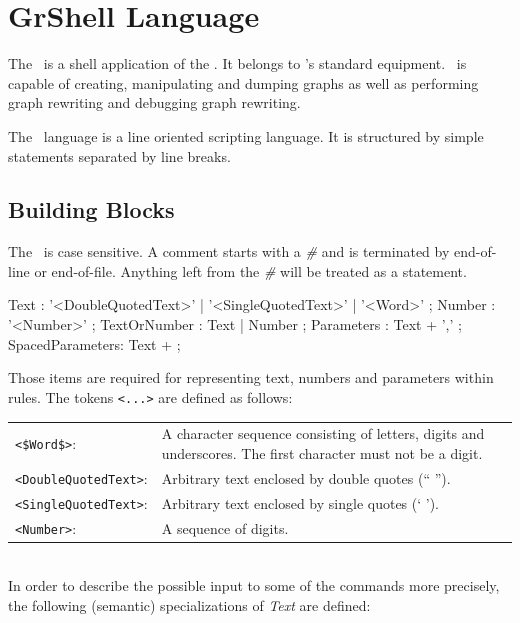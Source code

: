 \chapter{GrShell Language}
\label{chapgrshell}

The \GrShell\ is a shell application of the \LibGr. It belongs to \GrG's standard equipment. \GrShell\ is capable of creating, manipulating and dumping graphs as well as performing graph rewriting and debugging graph rewriting.

The \GrShell\ language is a line oriented scripting language. It is structured by simple statements separated by line breaks.

\section{Building Blocks}

The \GrShell\ is case sensitive. A comment starts with a \emph{\#} and is terminated by end-of-line or end-of-file. Anything left from the \emph{\#} will be treated as a statement.

\begin{rail} 
 Text : '<DoubleQuotedText>' | '<SingleQuotedText>' | '<Word>' ;
 Number : '<Number>' ;
 TextOrNumber : Text | Number ;
 Parameters : Text + ',' ;
 SpacedParameters: Text + ; 
\end{rail}

Those items are required for representing text, numbers and parameters within rules. The tokens \verb+<...>+ are defined as follows:\\

\begin{tabularx}{\linewidth}{lX}
\verb+<$Word$>+:            & A character sequence consisting of letters, digits and underscores. The first character must not be a digit.\\
\verb+<DoubleQuotedText>+:  & Arbitrary text enclosed by double quotes (`` '').\\
\verb+<SingleQuotedText>+:  & Arbitrary text enclosed by single quotes (` ').\\
\verb+<Number>+:            & A sequence of digits.
\end{tabularx}\\

In order to describe the possible input to some of the commands more precisely, the following (semantic) specializations of \emph{Text} are defined:\\

